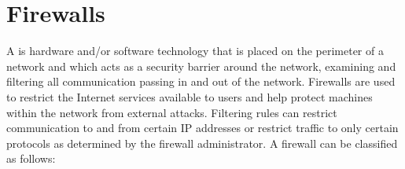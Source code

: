 
\section{Firewalls}\label{Se:Firewalls}
A  is hardware and/or software technology that is placed on the
perimeter of a network and which acts as a security barrier around the network,
examining and filtering all communication passing in and out of the network.
Firewalls are used to restrict the Internet services available to users and help protect
machines within the network from external attacks.
Filtering rules can restrict communication to and from certain IP addresses
or restrict traffic to only certain protocols as determined by the firewall administrator.
A firewall can be classified as follows:
